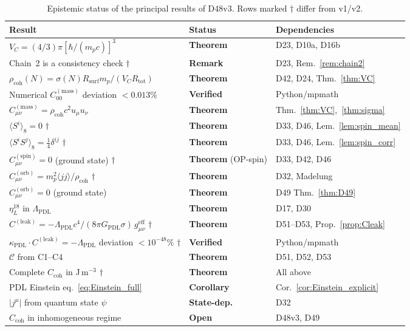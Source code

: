 \documentclass[12pt,a4paper]{article}
\newcommand{\hb}{\hbar}
\newcommand{\Ccoh}{C_{\mathrm{coh}}}
\newcommand{\Cmass}{C^{(\mathrm{mass})}}
\newcommand{\Cspin}{C^{(\mathrm{spin})}}
\newcommand{\Corb}{C^{(\mathrm{orb})}}
\newcommand{\Cleak}{C^{(\mathrm{leak})}}
\newcommand{\rhocoh}{\rho_{\mathrm{coh}}}
\newcommand{\sig}{\sigma}
\newcommand{\kPDL}{\kappa_{\mathrm{PDL}}}
\newcommand{\GPDL}{G_{\mathrm{PDL}}}
\newcommand{\geff}{g_{\mu\nu}^{\mathrm{eff}}}
\newcommand{\Rsurf}{R_{\mathrm{surf}}}
\newcommand{\Rtot}{R_{\mathrm{tot}}}
\newcommand{\VC}{V_C}
\newcommand{\etaL}{\eta_L}
\newcommand{\LambdaPDL}{\Lambda_{\mathrm{PDL}}}
\begin{document}
\begin{table}[H]
\centering
\caption{Epistemic status of the principal results of D48v3. Rows marked $\dagger$ differ from v1/v2.}
\label{tab:epistemic}
\small
\begin{tabular}{p{7.8cm}p{3.5cm}p{3.2cm}}
\toprule
Result & Status & Dependencies \\
\midrule
$\VC = (4/3)\pi[\hb/(m_p c)]^3$ & \textbf{Theorem} & D23, D10a, D16b \\
Chain~2 is a consistency check $\dagger$ & \textbf{Remark} & D23, Rem.~\ref{rem:chain2} \\
$\rhocoh(N) = \sig(N)\Rsurf m_p/(\VC\Rtot)$ & \textbf{Theorem} & D42, D24, Thm.~\ref{thm:VC} \\
Numerical $\Cmass_{00}$ deviation $<0.013\%$ & \textbf{Verified} & Python/mpmath \\
$\Cmass_{\mu\nu} = \rhocoh c^2 u_\mu u_\nu$ & \textbf{Theorem} & Thm.~\ref{thm:VC},~\ref{thm:sigma} \\
$\langle S^i\rangle_8 = 0$ $\dagger$ & \textbf{Theorem} & D33, D46, Lem.~\ref{lem:spin_mean} \\
$\langle S^iS^j\rangle_8 = \tfrac{1}{4}\delta^{ij}$ $\dagger$ & \textbf{Theorem} & D33, D46, Lem.~\ref{lem:spin_corr} \\
$\Cspin_{\mu\nu} = 0$ (ground state) $\dagger$ & \textbf{Theorem} (OP-spin) & D33, D42, D46 \\
$\Corb_{\mu\nu} = m_p^2\langle j j\rangle/\rhocoh$ $\dagger$ & \textbf{Theorem} & D32, Madelung \\
$\Corb_{\mu\nu} = 0$ (ground state) & \textbf{Theorem} & D49 Thm.~\ref{thm:D49} \\
$\etaL^{18}$ in $\LambdaPDL$ & \textbf{Theorem} & D17, D30 \\
$\Cleak = -\LambdaPDL c^4/(8\pi\GPDL\sig)\,\geff$ $\dagger$ & \textbf{Theorem} & D51--D53, Prop.~\ref{prop:Cleak} \\
$\kPDL\cdot\Cleak = -\LambdaPDL$ deviation $<10^{-48}\%$ $\dagger$ & \textbf{Verified} & Python/mpmath \\
$\mathcal{C}$ from C1--C4 & \textbf{Theorem} & D51, D52, D53 \\
Complete $\Ccoh$ in J\,m$^{-3}$ $\dagger$ & \textbf{Theorem} & All above \\
PDL Einstein eq.~\eqref{eq:Einstein_full} & \textbf{Corollary} & Cor.~\ref{cor:Einstein_explicit} \\
\midrule
$|j^\mu|$ from quantum state $\psi$ & \textbf{State-dep.} & D32 \\
$\Ccoh$ in inhomogeneous regime & \textbf{Open} & D48v3, D49 \\
\bottomrule
\end{tabular}
\end{table}
\end{document}
